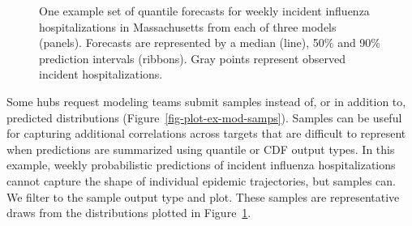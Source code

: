 \documentclass[
]{article}
\begin{document}
\begin{figure}[H]


\caption{\label{fig-plot-ex-mods}One example set of quantile forecasts
for weekly incident influenza hospitalizations in Massachusetts from
each of three models (panels). Forecasts are represented by a median
(line), 50\% and 90\% prediction intervals (ribbons). Gray points
represent observed incident hospitalizations.}

\end{figure}%

Some hubs request modeling teams submit samples instead of, or in
addition to, predicted distributions
(Figure~\ref{fig-plot-ex-mod-samps}). Samples can be useful for
capturing additional correlations across targets that are difficult to
represent when predictions are summarized using quantile or CDF output
types. In this example, weekly probabilistic predictions of incident
influenza hospitalizations cannot capture the shape of individual
epidemic trajectories, but samples can. We filter to the sample output
type and plot. These samples are representative draws from the
distributions plotted in Figure~\ref{fig-plot-ex-mods}.
\end{document}
